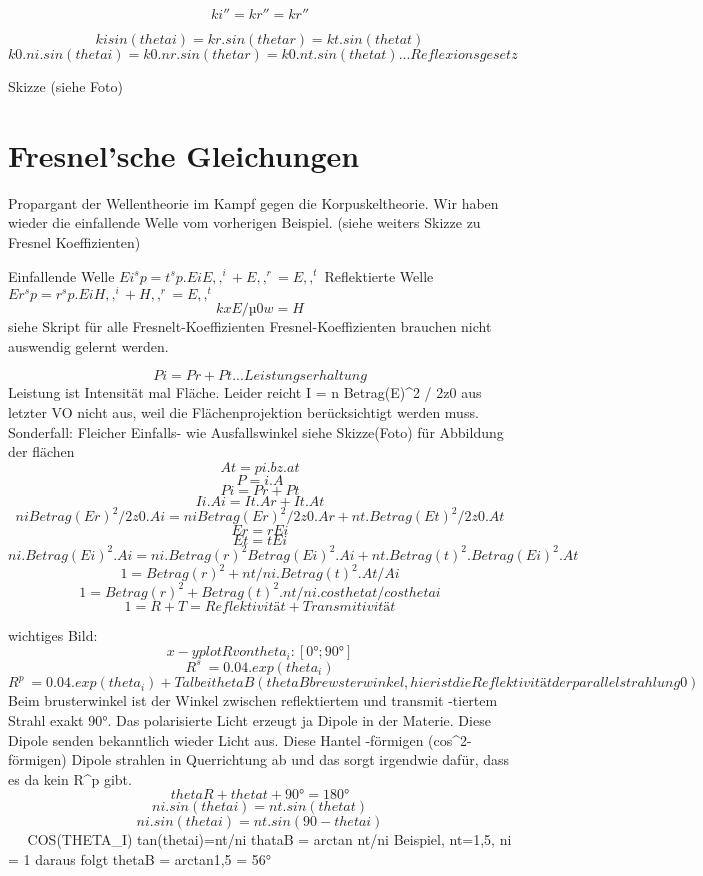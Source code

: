 \documentclass[a4paper]{article}
\begin{document}
\[ki'' = kr'' = kr''\]

\[kisin(thetai)  = kr . sin(thetar) = kt.sin(thetat)\]
\[k0.ni.sin(thetai) = k0.nr.sin(thetar)=k0.nt.sin(thetat)  ... Reflexionsgesetz\]

Skizze (siehe Foto)



\section*{Fresnel'sche Gleichungen}
Propargant der Wellentheorie im Kampf gegen die Korpuskeltheorie.
Wir haben wieder die einfallende Welle vom vorherigen Beispiel. (siehe weiters Skizze zu Fresnel Koeffizienten)

Einfallende Welle $Ei^sp = t^sp.Ei           E,,^i + E,,^r =E,,^t$
Reflektierte Welle $Er^sp = r^sp.Ei          H,,^i + H,,^r = E,,^t$
\[                                            kxE/µ0w=H\]
        siehe Skript für alle Fresnelt-Koeffizienten
        Fresnel-Koeffizienten brauchen nicht auswendig gelernt werden.

        \[Pi = Pr + Pt ... Leistungserhaltung\]
Leistung ist Intensität mal Fläche. Leider reicht I = n Betrag(E)^2 / 2z0 aus
letzter VO nicht aus, weil die Flächenprojektion berücksichtigt werden muss.
Sonderfall: Fleicher Einfalls- wie Ausfallswinkel
        siehe Skizze(Foto) für Abbildung der flächen
        \[        At = pi.bz.at\]
        \[        P = i.A\]
        \[        Pi = Pr + Pt\]
        \[        Ii . Ai = It.Ar + It.At\]
        \[        niBetrag(Er)^2 / 2z0 . Ai = niBetrag(Er)^2 / 2z0 . Ar + nt.Betrag(Et)^2 / 2z0 . At\]
        \[        Er=rEi\]
        \[        Et=tEi\]
        \[        ni.Betrag(Ei)^2.Ai = ni.Betrag(r)^2Betrag(Ei)^2.Ai + nt.Betrag(t)^2. Betrag(Ei)^2.At\]
        \[        1 = Betrag(r)^2 + nt/ni . Betrag(t)^2 . At/Ai\]
        \[        1 = Betrag(r)^2 + Betrag(t)^2.nt/ni.costhetat/costhetai\]
        \[        1 =    R        +      T = Reflektivität + Transmitivität\]

wichtiges Bild:
\[    x-y plot R von theta_i: [0°; 90°]\]
\[    R^s ~=0.04 . exp(theta_i)\]
\[    R^p ~= 0.04 .exp(theta_i) + Tal bei theta B (theta B brewsterwinkel, hier ist die Reflektivität der parallelstrahlung 0)\]
    Beim brusterwinkel ist der Winkel zwischen reflektiertem und transmit
    -tiertem Strahl exakt 90°. Das polarisierte Licht erzeugt ja Dipole in der
    Materie. Diese Dipole senden bekanntlich wieder Licht aus. Diese Hantel
    -förmigen (cos^2-förmigen) Dipole strahlen in Querrichtung ab und das sorgt
    irgendwie dafür, dass es da kein R^p gibt.
    \[    thetaR+thetat+90°=180°\]
    \[    ni.sin(thetai)=nt.sin(thetat)\]
    \[    ni.sin(thetai)=nt.sin(90-thetai)\]
                    ^^^^^^^^^^^^^^^
                        COS(THETA_I)
    tan(thetai)=nt/ni
    thataB = arctan nt/ni       Beispiel, nt=1,5, ni = 1 daraus folgt thetaB = arctan1,5 = 56°
\end{document}
